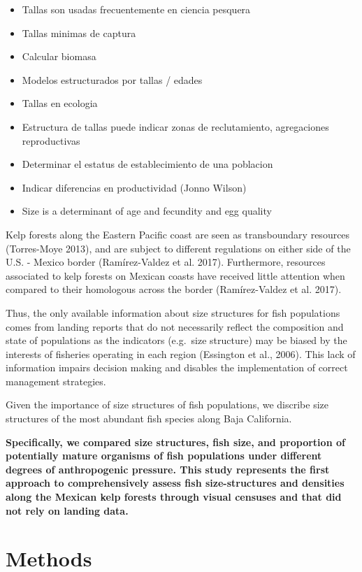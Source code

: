 \documentclass[12pt,]{article}
\begin{document}
\begin{itemize}
\item
  Tallas son usadas frecuentemente en ciencia pesquera
\item
  Tallas minimas de captura
\item
  Calcular biomasa
\item
  Modelos estructurados por tallas / edades
\item
  Tallas en ecologia
\item
  Estructura de tallas puede indicar zonas de reclutamiento,
  agregaciones reproductivas
\item
  Determinar el estatus de establecimiento de una poblacion
\item
  Indicar diferencias en productividad (Jonno Wilson)
\item
  Size is a determinant of age and fecundity and egg quality
\end{itemize}

Kelp forests along the Eastern Pacific coast are seen as transboundary
resources (Torres-Moye 2013), and are subject to different regulations
on either side of the U.S. - Mexico border (Ramírez-Valdez et al. 2017).
Furthermore, resources associated to kelp forests on Mexican coasts have
received little attention when compared to their homologous across the
border (Ramírez-Valdez et al. 2017).

Thus, the only available information about size structures for fish
populations comes from landing reports that do not necessarily reflect
the composition and state of populations as the indicators (e.g.~size
structure) may be biased by the interests of fisheries operating in each
region (Essington et al., 2006). This lack of information impairs
decision making and disables the implementation of correct management
strategies.

Given the importance of size structures of fish populations, we discribe
size structures of the most abundant fish species along Baja California.

\textbf{Specifically, we compared size structures, fish size, and
proportion of potentially mature organisms of fish populations under
different degrees of anthropogenic pressure. This study represents the
first approach to comprehensively assess fish size-structures and
densities along the Mexican kelp forests through visual censuses and
that did not rely on landing data.}

\section{Methods}\label{methods}
\end{document}
